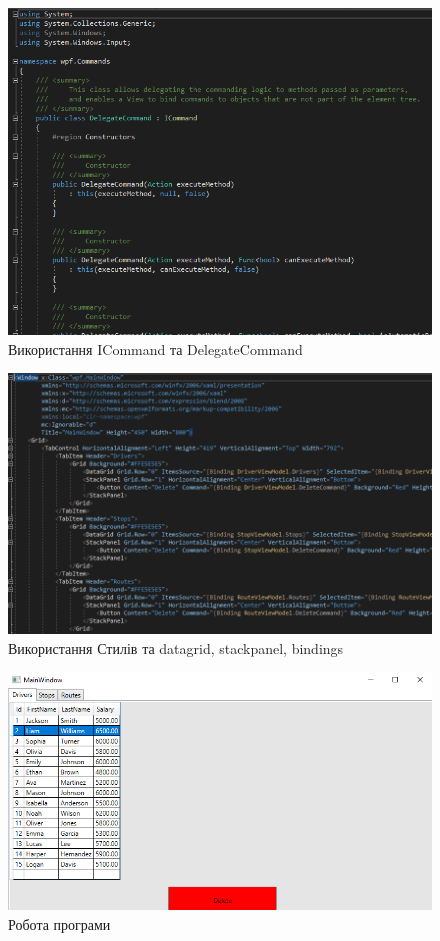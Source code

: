\documentclass[14pt]{extreport}
\begin{document}
\begin{normalsize}
	\begin{figure}[H]
		\centering
		\includegraphics[scale=0.8]{1}
		\caption{Використання ICommand та DelegateCommand}
	\end{figure}
	
	
	\begin{figure}[H]
		\centering
		\includegraphics[scale=0.7]{2}
		\caption{Використання Стилів та datagrid, stackpanel, bindings}
	\end{figure}
	
	
	\begin{figure}[H]
		\centering
		\includegraphics[scale=0.7]{3}
		\caption{Робота програми}
	\end{figure}
	

\end{normalsize}
\end{document}
